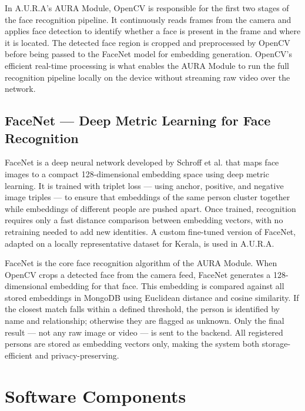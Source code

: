 In A.U.R.A's AURA Module, OpenCV is responsible for the first two stages of the face recognition pipeline. It continuously reads frames from the camera and applies face detection to identify whether a face is present in the frame and where it is located. The detected face region is cropped and preprocessed by OpenCV before being passed to the FaceNet model for embedding generation. OpenCV's efficient real-time processing is what enables the AURA Module to run the full recognition pipeline locally on the device without streaming raw video over the network.

\subsection{FaceNet --- Deep Metric Learning for Face Recognition}
FaceNet is a deep neural network developed by Schroff et al. that maps face images to a compact 128-dimensional embedding space using deep metric learning. It is trained with triplet loss --- using anchor, positive, and negative image triples --- to ensure that embeddings of the same person cluster together while embeddings of different people are pushed apart. Once trained, recognition requires only a fast distance comparison between embedding vectors, with no retraining needed to add new identities. A custom fine-tuned version of FaceNet, adapted on a locally representative dataset for Kerala, is used in A.U.R.A.

FaceNet is the core face recognition algorithm of the AURA Module. When OpenCV crops a detected face from the camera feed, FaceNet generates a 128-dimensional embedding for that face. This embedding is compared against all stored embeddings in MongoDB using Euclidean distance and cosine similarity. If the closest match falls within a defined threshold, the person is identified by name and relationship; otherwise they are flagged as unknown. Only the final result --- not any raw image or video --- is sent to the backend. All registered persons are stored as embedding vectors only, making the system both storage-efficient and privacy-preserving.

\section{Software Components}

